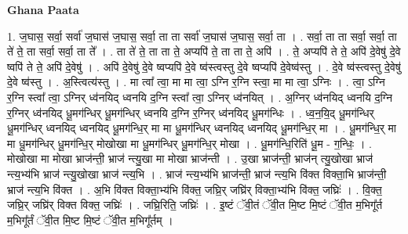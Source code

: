\documentclass[17pt]{extarticle}
\begin{document}
\textbf{Ghana Paata } \newline

1. ज॒घास॒ सर्वा॒ सर्वा॑ ज॒घास॑ ज॒घास॒ सर्वा॒ ता ता सर्वा॑ ज॒घास॑ ज॒घास॒ सर्वा॒ ता । . सर्वा॒ ता ता सर्वा॒ सर्वा॒ ता ते॑ ते॒ ता सर्वा॒ सर्वा॒ ता ते᳚ । . ता ते॑ ते॒ ता ता ते॒ अप्यपि॑ ते॒ ता ता ते॒ अपि॑ । . ते॒ अप्यपि॑ ते ते॒ अपि॑ दे॒वेषु॑ दे॒वे ष्वपि॑ ते ते॒ अपि॑ दे॒वेषु॑ । . अपि॑ दे॒वेषु॑ दे॒वे ष्वप्यपि॑ दे॒वे ष्व॑स्त्वस्तु दे॒वे ष्वप्यपि॑ दे॒वेष्व॑स्तु । . दे॒वे ष्व॑स्त्वस्तु दे॒वेषु॑ दे॒वे ष्व॑स्तु । . अ॒स्त्वित्य॑स्तु । . मा त्वा᳚ त्वा॒ मा मा त्वा॒ ऽग्नि र॒ग्नि स्त्वा॒ मा मा त्वा॒ ऽग्निः । . त्वा॒ ऽग्नि र॒ग्नि स्त्वा᳚ त्वा॒ ऽग्निर् ध्व॑नयिद् ध्वनयि द॒ग्नि स्त्वा᳚ त्वा॒ ऽग्निर् ध्व॑नयित् । . अ॒ग्निर् ध्व॑नयिद् ध्वनयि द॒ग्नि र॒ग्निर् ध्व॑नयिद् धू॒मग॑न्धिर् धू॒मग॑न्धिर् ध्वनयि द॒ग्नि र॒ग्निर् ध्व॑नयिद् धू॒मग॑न्धिः । . ध्व॒न॒यि॒द् धू॒मग॑न्धिर् धू॒मग॑न्धिर् ध्वनयिद् ध्वनयिद् धू॒मग॑न्धि॒र् मा मा धू॒मग॑न्धिर् ध्वनयिद् ध्वनयिद् धू॒मग॑न्धि॒र् मा । . धू॒मग॑न्धि॒र् मा मा धू॒मग॑न्धिर् धू॒मग॑न्धि॒र् मोखोखा मा धू॒मग॑न्धिर् धू॒मग॑न्धि॒र् मोखा । . धू॒मग॑न्धि॒रिति॑ धू॒म - ग॒न्धिः॒ । . मोखोखा मा मोखा भ्राज॑न्ती॒ भ्राज॑ न्त्यु॒खा मा मोखा भ्राज॑न्ती । . उ॒खा भ्राज॑न्ती॒ भ्राज॑न् त्यु॒खोखा भ्राज॑ न्त्य॒भ्य॑भि भ्राज॑ न्त्यु॒खोखा भ्राज॑ न्त्य॒भि । . भ्राज॑ न्त्य॒भ्य॑भि भ्राज॑न्ती॒ भ्राज॑ न्त्य॒भि वि॑क्त विक्ता॒भि भ्राज॑न्ती॒ भ्राज॑ न्त्य॒भि वि॑क्त । . अ॒भि वि॑क्त विक्ता॒भ्य॑भि वि॑क्त॒ जघ्रि॒र् जघ्रि॑र् विक्ता॒भ्य॑भि वि॑क्त॒ जघ्रिः॑ । . वि॒क्त॒ जघ्रि॒र् जघ्रि॑र् विक्त विक्त॒ जघ्रिः॑ । . जघ्रि॒रिति॒ जघ्रिः॑ । . इ॒ष्टं ॅवी॒तं ॅवी॒त मि॒ष्ट मि॒ष्टं ॅवी॒त म॒भिगू᳚र्त म॒भिगू᳚र्तं ॅवी॒त मि॒ष्ट मि॒ष्टं ॅवी॒त म॒भिगू᳚र्तम् । \newline
\end{document}
